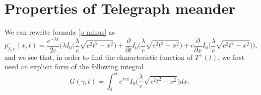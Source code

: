 \documentclass{article}
\theoremstyle{definition}
\numberwithin{equation}{section}
\begin{document}
\section{Properties of Telegraph meander}
We can rewrite formula \eqref{p minus} as
\begin{equation}\label{p minus 2}
p_{\lambda,c}^{-}(x,t) = \frac{e^{-\lambda t}}{2c}\bigg(\lambda I_0\big(\frac{\lambda}{c}\sqrt{c^2t^2-x^2}\big)+\frac{\partial}{\partial t}I_0\big(\frac{\lambda}{c}\sqrt{c^2t^2-x^2}\big)+c\frac{\partial}{\partial x}I_0\big(\frac{\lambda}{c}\sqrt{c^2t^2-x^2}\big) \bigg),
\end{equation}
and we see that, in order to find the characteristic function of $T^+(t)$, we first need an explicit form of the following integral
\begin{equation}\label{G function}
G(\gamma,t) = \int_0^{ct}e^{i\gamma x}I_0\big(\frac{\lambda}{c}\sqrt{c^2t^2-x^2}\big)dx.
\end{equation}
\end{document}
